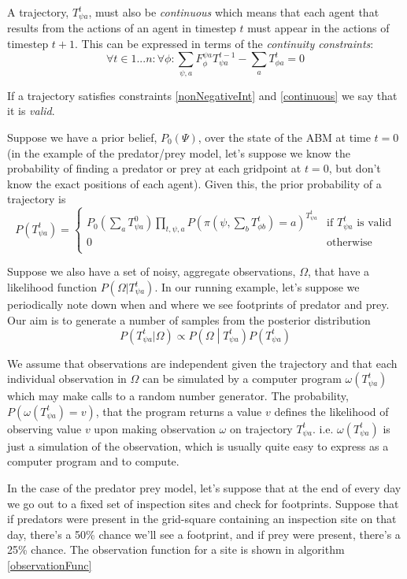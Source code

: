 \documentclass{article}
\begin{document}
A trajectory, $T^t_{\psi a}$, must also be \textit{continuous} which means that each agent that results from the actions of an agent in timestep $t$ must appear in the actions of timestep $t+1$. This can be expressed in terms of the \textit{continuity constraints}:
\begin{equation}
\forall t \in 1 ... n:\forall \phi: \sum_{\psi, a} F_\phi^{\psi a}T^{t-1}_{\psi a} - \sum_a T^t_{\phi a} = 0
\label{continuous}
\end{equation}

If a trajectory satisfies constraints \ref{nonNegativeInt} and \ref{continuous} we say that it is \textit{valid}.

Suppose we have a prior belief, $P_0(\Psi)$, over the state of the ABM at time $t=0$ (in the example of the predator/prey model, let's suppose we know the probability of finding a predator or prey at each gridpoint at $t=0$, but don't know the exact positions of each agent). Given this, the prior probability of a trajectory is
\[
P(T^t_{\psi a}) =
\begin{cases}
P_0(\sum_aT^0_{\psi a}) \prod_{t, \psi, a} P(\pi(\psi,\sum_bT^{t}_{\phi b})=a)^{T^{t}_{\psi a}} & \text{if } T^t_{\psi a} \text{ is valid} \\
0 & \text{otherwise}\\
\end{cases}
\]

Suppose we also have a set of noisy, aggregate observations, $\Omega$, that have a likelihood function $P(\Omega|T^t_{\psi a})$. In our running example, let's suppose we periodically note down when and where we see footprints of predator and prey. Our aim is to generate a number of samples from the posterior distribution
\[
P(T^t_{\psi a}|\Omega) \propto P\left(\Omega \middle| T^{t}_{\psi a}\right)P(T^t_{\psi a})
\]

We assume that observations are independent given the trajectory and that each individual observation in $\Omega$ can be simulated by a computer program $\omega(T^t_{\psi a})$ which may make calls to a random number generator. The probability, $P(\omega(T^t_{\psi a}) = v)$, that the program returns a value $v$ defines the likelihood of observing value $v$ upon making observation $\omega$ on trajectory $T^t_{\psi a}$. i.e. $\omega(T^t_{\psi a})$ is just a simulation of the observation, which is usually quite easy to express as a computer program and to compute. 

In the case of the predator prey model, let's suppose that at the end of every day we go out to a fixed set of inspection sites and check for footprints. Suppose that if predators were present in the grid-square containing an inspection site on that day, there's a 50\% chance we'll see a footprint, and if prey were present, there's a 25\% chance. The observation function for a site is shown in algorithm \ref{observationFunc}
\end{document}
